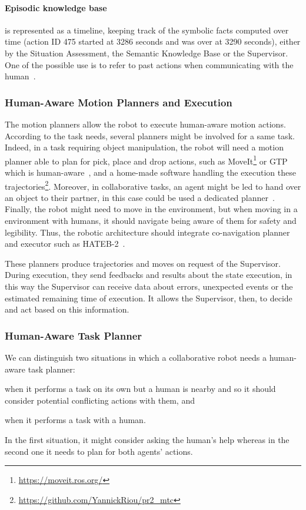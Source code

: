 \documentclass[a4paper,11pt,twoside]{StyleThese}
\begin{document}
\paragraph{Episodic knowledge base} is represented as a timeline, keeping track of the symbolic facts computed over time (\eg action ID 475 started at 3286 seconds and was over at 3290 seconds), either by the Situation Assessment, the Semantic Knowledge Base or the Supervisor. One of the possible use is to refer to past actions when communicating with the human~\cite{sarthou_2021_extending}.


\subsubsection{Human-Aware Motion Planners and Execution}\label{chap3:subsubsec:motion}
The motion planners allow the robot to execute human-aware motion actions. According to the task needs, several planners might be involved for a same task. Indeed, in a task requiring object manipulation, the robot will need a motion planner able to plan for pick, place and drop actions, such as MoveIt\footnote{\url{https://moveit.ros.org/}} or GTP which is human-aware~\cite{waldhart_2016_novel}, and a home-made software handling the execution these trajectories\footnote{\url{https://github.com/YannickRiou/pr2_mtc}}. Moreover, in collaborative tasks, an agent might be led to hand over an object to their partner, in this case could be used a dedicated planner~\cite{mainprice_2012_sharing}. Finally, the robot might need to move in the environment, but when moving in a environment with humans, it should navigate being aware of them for safety and legibility. Thus, the robotic architecture should integrate co-navigation planner and executor such as HATEB-2~\cite{singamaneni_2020_hateb}. 

These planners produce trajectories and moves on request of the Supervisor. During execution, they send feedbacks and results about the state execution, in this way the Supervisor can receive data about errors, unexpected events or the estimated remaining time of execution. It allows the Supervisor, then, to decide and act based on this information.

\subsubsection{Human-Aware Task Planner}\label{chap3:subsubsec:task_planner}
We can distinguish two situations in which a collaborative robot needs a human-aware task planner: 
\begin{inlineEnumerate}
	\item when it performs a task on its own but a human is nearby and so it should consider potential conflicting actions with them, and
	\item when it performs a task with a human.
\end{inlineEnumerate} 
In the first situation, it might consider asking the human's help whereas in the second one it needs to plan for both agents' actions. 
\end{document}
